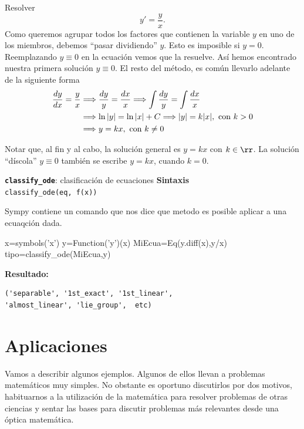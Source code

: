 \begin{ejemplo}{} Resolver
\[y'=\frac{y}{x}.\]
Como queremos agrupar todos los factores que contienen la variable $y$ en uno de los miembros, debemos ``pasar dividiendo'' $y$. Esto es imposible si $y=0$. Reemplazando $y\equiv 0$ en la ecuación vemos que la resuelve. Así hemos encontrado nuestra primera solución $y\equiv 0$. El resto del método, es común llevarlo adelante de la siguiente forma
\[\begin{split}
   \frac{dy}{dx}=\frac{y}{x} &\Longrightarrow \frac{dy}{y}=\frac{dx}{x} \Longrightarrow \int \frac{dy}{y}=\int \frac{dx}{x}\\
   &\Longrightarrow\ln|y|=\ln|x|+C \Longrightarrow |y|= k|x|, \hbox{ con }k>0\\
   &\Longrightarrow y= kx, \hbox{ con }k\neq 0
  \end{split}
\]
\end{ejemplo}
Notar que, al fin y al cabo, la solución general es $y=kx$ con $k\in\rr$. La solución ``díscola'' $y\equiv 0$ también se escribe $y=kx$, cuando $k=0$.


\begin{mdframed}[style=MiEstilo]\relax%
\textbf{\texttt{classify\_ode}}: clasificación de ecuaciones
\textbf{Sintaxis}\\
\texttt{classify\_ode(eq, f(x))}\\
\end{mdframed}


Sympy contiene un comando que nos dice que metodo es posible aplicar a una ecuaqción dada.
\begin{pyverbatim}
x=symbols('x')
y=Function('y')(x)
MiEcua=Eq(y.diff(x),y/x)
tipo=classify_ode(MiEcua,y)
\end{pyverbatim}

\textbf{Resultado:}\\
\begin{verbatim}
('separable', '1st_exact', '1st_linear', 
'almost_linear', 'lie_group',  etc)
\end{verbatim}


\section{Aplicaciones}

Vamos a describir algunos ejemplos. Algunos de ellos llevan a problemas matemáticos muy simples. No obstante es oportuno discutirlos por dos motivos, habituarnos a la utilización de la matemática para resolver problemas de otras ciencias y sentar las bases para discutir problemas más relevantes desde una óptica matemática.

